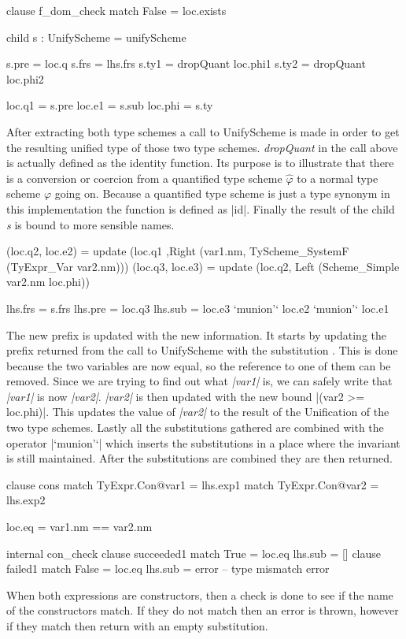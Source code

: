 \begin{code}
clause f_dom_check
  match False = loc.exists
  
  child s : UnifyScheme = unifyScheme
  
  s.pre    = loc.q
  s.frs    = lhs.frs
  s.ty1    = dropQuant loc.phi1
  s.ty2    = dropQuant loc.phi2
           
  loc.q1   = s.pre
  loc.e1   = s.sub
  loc.phi  = s.ty
\end{code}
After extracting both type schemes a call to UnifyScheme is made in order to get the resulting unified type of those two type schemes. \emph{dropQuant} in the call above is actually defined as the identity function. Its purpose is to illustrate that there is a conversion or coercion from a quantified type scheme $\hat{\varphi}$ to a normal type scheme $\varphi$ going on. Because a quantified type scheme is just a type synonym in this implementation the function is defined as |id|. Finally the result of the child \emph{s} is bound to more sensible names.

\begin{code}                            
(loc.q2, loc.e2)
  = update (loc.q1
           ,Right (var1.nm, TyScheme_SystemF (TyExpr_Var var2.nm)))
(loc.q3, loc.e3) 
  = update (loc.q2, Left (Scheme_Simple var2.nm loc.phi)) 

lhs.frs = s.frs
lhs.pre = loc.q3
lhs.sub = loc.e3 `munion'` loc.e2 `munion'` loc.e1
\end{code}
The new prefix is updated with the new information. It starts by updating the prefix returned from the call to UnifyScheme with the substitution . This is done because the two variables are now equal, so the reference to one of them can be removed. Since we are trying to find out what \emph{|var1|} is, we can safely write that \emph{|var1|} is now \emph{|var2|}. \emph{|var2|} is then updated with the new bound |(var2 >= loc.phi)|. This updates the value of \emph{|var2|} to the result of the Unification of the two type schemes. Lastly all the substitutions gathered are combined with the operator |`munion'`| which inserts the substitutions in a place where the invariant is still maintained. After the substitutions are combined they are then returned.

\begin{code}
clause cons
  match TyExpr.Con@var1 = lhs.exp1
  match TyExpr.Con@var2 = lhs.exp2
  
  loc.eq = var1.nm == var2.nm
  
  internal con_check
     clause succeeded1
       match True  = loc.eq
       lhs.sub     = []
     clause failed1
       match False = loc.eq
       lhs.sub = error -- type mismatch error
\end{code}
When both expressions are constructors, then a check is done to see if the name of the constructors match. If they do not match then an error is thrown, however if they match then return with an empty substitution.

